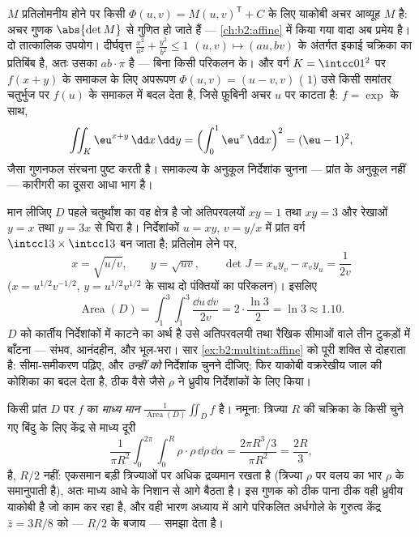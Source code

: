 \begin{example}[आनत चर-परिवर्तन]\label{ex:b2:multint:affine}
$M$ प्रतिलोमनीय होने पर किसी  $\Phi(u, v) = M(u, v)^{\mathsf T} + C$ के लिए याकोबी
अचर आव्यूह $M$ है:  अचर गुणक $\abs{\det M}$ से गुणित हो जाते हैं
--- \cref{ch:b2:affine} में किया गया वादा अब प्रमेय है। दो तात्कालिक उपयोग।
दीर्घवृत्त $\frac{x^2}{a^2} +
\frac{y^2}{b^2} \leq 1$ $(u, v) \mapsto (au, bv)$ के अंतर्गत इकाई चक्रिका का प्रतिबिंब है, अतः
उसका  $ab \cdot \pi$ है --- बिना किसी परिकलन के। और वर्ग $K = \intcc01^2$ पर
$f(x + y)$ के समाकल के लिए अपरूपण $\Phi(u, v) = (u - v, v)$ ( $1$) उसे किसी समांतर
चतुर्भुज पर $f(u)$ के समाकल में बदल देता है, जिसे फ़ूबिनी अचर $u$
पर काटता है: $f =
\exp$ के साथ,
\[
\iint_K \eu^{x+y}\,\dd x\,\dd y
= \Bigl(\int_0^1 \eu^x\,\dd x\Bigr)^2 = (\eu - 1)^2,
\]
जैसा गुणनफल संरचना पुष्ट करती है। समाकल्य के अनुकूल निर्देशांक
चुनना --- प्रांत के अनुकूल नहीं --- कारीगरी का दूसरा आधा भाग है।
\end{example}


\begin{example}[किसी वक्ररेखीय प्रांत के अनुकूल
निर्देशांक]\label{ex:b2:multint:hyperbolicregion}
मान लीजिए $D$ पहले चतुर्थांश का वह क्षेत्र है जो अतिपरवलयों $xy = 1$
तथा $xy = 3$ और रेखाओं $y = x$ तथा $y = 3x$ से घिरा है। निर्देशांकों $u = xy$, $v = y/x$
में प्रांत वर्ग $\intcc13 \times \intcc13$ बन जाता है; प्रतिलोम लेने पर,
\[
x = \sqrt{u/v}, \qquad y = \sqrt{uv},
\qquad
\det J = x_uy_v - x_vy_u = \frac{1}{2v}
\]
($x = u^{1/2}v^{-1/2}$, $y =
u^{1/2}v^{1/2}$ के साथ दो पंक्तियों का परिकलन)। इसलिए
\[
\operatorname{Area}(D)
= \int_1^3\!\!\int_1^3\frac{\dd u\,\dd v}{2v}
= 2\cdot\frac{\ln 3}{2} = \ln 3 \approx 1.10 .
\]
$D$ को कार्तीय निर्देशांकों में काटने का अर्थ है उसे अतिपरवलयी
तथा रैखिक सीमाओं वाले तीन टुकड़ों में बाँटना --- संभव, आनंदहीन, और
भूल-भरा। सार \cref{ex:b2:multint:affine} को पूरी शक्ति से दोहराता है: सीमा-समीकरण पढ़िए,
और \emph{उन्हीं को} निर्देशांक चुनने दीजिए; फिर याकोबी वक्ररेखीय
जाल की कोशिका का  बदल देता है, ठीक वैसे जैसे $\rho$ ने
ध्रुवीय निर्देशांकों के लिए किया।
\end{example}

\begin{example}[माध्य मान]\label{ex:b2:multint:average}
किसी प्रांत $D$ पर $f$ का \emph{माध्य मान} $\frac1{\operatorname{Area}(D)}\iint_Df$ है। नमूना:
त्रिज्या $R$ की चक्रिका के किसी  चुने गए बिंदु के लिए
केंद्र से माध्य दूरी
\[
\frac{1}{\pi R^2}\int_0^{2\pi}\!\!\int_0^R
\rho\cdot\rho\,\dd\rho\,\dd\alpha
= \frac{2\pi R^3/3}{\pi R^2} = \frac{2R}3 ,
\]
है, $R/2$ नहीं: एकसमान  बड़ी त्रिज्याओं पर अधिक द्रव्यमान
रखता है (त्रिज्या $\rho$ पर वलय का भार $\rho$ के समानुपाती है), अतः
माध्य आधे के निशान से आगे बैठता है। इस गुणक को ठीक पाना ठीक वही
ध्रुवीय याकोबी है जो काम कर रहा है, और वही भारण अध्याय में आगे
परिकलित अर्धगोले के गुरुत्व केंद्र $\bar z = 3R/8$ को --- $R/2$ के बजाय ---
समझा देता है।
\end{example}

